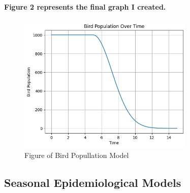 \paragraph{\textbf{Figure 2} represents the final graph I created.}
% 
% 
\begin{figure}[H]
    \centering
    \includegraphics[width=0.75\textwidth]{pic/BirdPopullationModel.png}
    \caption{Figure of Bird Popullation Model}
\end{figure}
% 
% 
% 
% 
% 
% 
% 
% 
% 
% 
\subsection{Seasonal Epidemiological Models}
% 
% 
